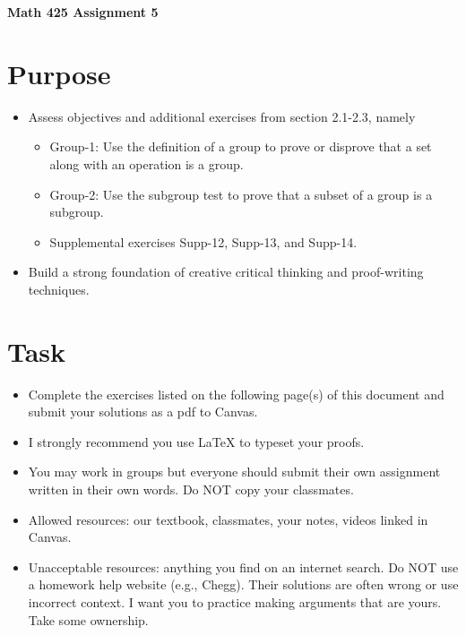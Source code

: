\documentclass[12pt]{article}
\begin{document}
	\begin{center}
		{\Large \bf Math 425 Assignment 5}
	\end{center}
	\section*{Purpose}
		\begin{itemize}
			\item Assess objectives and additional exercises from section 2.1-2.3, namely
				\begin{itemize}
					\item Group-1: Use the definition of a group to prove or disprove that a set along with an operation is a group.
					\item Group-2: Use the subgroup test to prove that a subset of a group is a subgroup.
					\item Supplemental exercises Supp-12, Supp-13, and Supp-14. 
				\end{itemize}
			\item Build a strong foundation of creative critical thinking and proof-writing techniques.
		\end{itemize}
	\section*{Task}
		\begin{itemize}
			\item Complete the exercises listed on the following page(s) of this document and submit your solutions as a pdf to Canvas.
			\item I strongly recommend you use LaTeX to typeset your proofs.
			\item You may work in groups but everyone should submit their own assignment written in their own words.  Do NOT copy your classmates.
			\item Allowed resources: our textbook, classmates, your notes, videos linked in Canvas.
			\item Unacceptable resources: anything you find on an internet search. Do NOT use a homework help website (e.g., Chegg). Their solutions are often wrong or use incorrect context.  I want you to practice making arguments that are yours. Take some ownership.
		\end{itemize}
\end{document}
